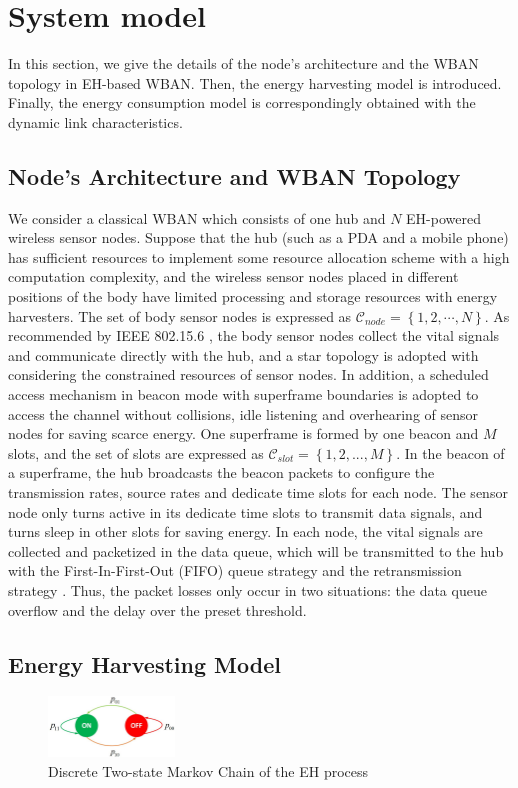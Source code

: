 \documentclass[journal,10pt]{IEEEtran}
\begin{document}
\section{System model} \label{sec:system_model}
In this section, we give the details of the node's architecture and the WBAN topology in EH-based WBAN. Then, the energy harvesting model is introduced. Finally, the energy consumption model is correspondingly obtained with the dynamic link characteristics.

\subsection{Node's Architecture and WBAN Topology}
We consider a classical WBAN which consists of one hub and $N$ EH-powered wireless sensor nodes. 
Suppose that the hub (such as a PDA and a mobile phone) has sufficient resources to implement some resource allocation scheme with a high computation complexity, and the wireless sensor nodes placed in different positions of the body have limited processing and storage resources with energy harvesters. The set of body sensor nodes is expressed as $\mathcal{C}_{node}=\left\{1,2,\cdots,N \right\}$. As recommended by IEEE 802.15.6 \cite{ieee2012WBAN}, the body sensor nodes collect the vital signals and communicate directly with the hub, and a star topology is adopted with considering the constrained resources of sensor nodes. In addition, a scheduled access mechanism in beacon mode with superframe boundaries is adopted to access the channel without collisions, idle listening and overhearing of sensor nodes for saving scarce energy. One superframe is formed by one beacon and $M$ slots, and the set of slots are expressed as $\mathcal{C}_{slot}=\left\{1,2,...,M\right\}$. In the beacon of a superframe, the hub broadcasts the beacon packets to configure the transmission rates, source rates and dedicate time slots for each node. The sensor node only turns active in its dedicate time slots to transmit data signals, and turns sleep in other slots for saving energy. In each node, the vital signals are collected and packetized in the data queue, which will be transmitted to the hub with the First-In-First-Out (FIFO) queue strategy and the retransmission strategy \cite{liu2017buffer}. Thus, the packet losses only occur in two situations: the data queue overflow and the delay over the preset threshold. 

\subsection{Energy Harvesting Model}
\begin{figure}[!htb]
\centering
\includegraphics[width=0.3\textwidth]{markov_model}
\caption{Discrete Two-state Markov Chain of the EH process}
\label{fig:markov_model}
\end{figure}
\end{document}
